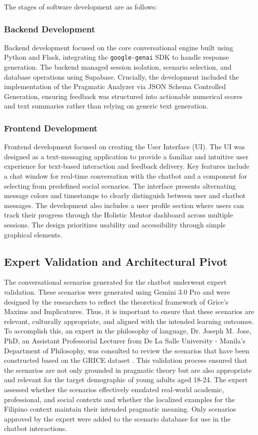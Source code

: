 The stages of software development are as follows:

\subsubsection{Backend Development}
\indent Backend development focused on the core conversational engine built using Python and Flask, integrating the \texttt{google-genai} SDK to handle response generation. 
The backend managed session isolation, scenario selection, and database operations using Supabase. Crucially, the development included the implementation of the 
Pragmatic Analyzer via JSON Schema Controlled Generation, ensuring feedback was structured into actionable numerical scores and text summaries rather than relying on 
generic text generation.

\subsubsection{Frontend Development}
\indent Frontend development focused on creating the User Interface (UI). The UI was designed as a 
text-messaging application to provide a familiar and intuitive user experience for text-based interaction and feedback delivery. Key features include a 
chat window for real-time conversation with the chatbot and a component for selecting from predefined social scenarios. The interface presents 
alternating message colors and timestamps to clearly distinguish between user and chatbot messages. The development also includes 
a user profile section where users can track their progress through the Holistic Mentor dashboard across multiple sessions. 
The design prioritizes usability and accessibility through simple graphical elements.

\subsection{Expert Validation and Architectural Pivot}
\indent The conversational scenarios generated for the chatbot underwent expert validation. 
These scenarios were generated using Gemini 3.0 Pro and were designed by the researchers to reflect the theoretical 
framework of Grice's Maxims and Implicatures. Thus, it is important to ensure that these scenarios are relevant, culturally appropriate, and aligned with the intended learning 
outcomes. To accomplish this, an expert in the philosophy of language, Dr. Joseph M. Jose, PhD, an Assistant Professorial Lecturer from 
De La Salle University - Manila's Department of Philosophy, was consulted to review the scenarios that have been constructed based on the 
GRICE dataset \cite{zheng_grice_2021}. This validation process ensured that the scenarios are not only grounded in pragmatic theory but are also appropriate and relevant 
for the target demographic of young adults aged 18-24. The expert assessed whether the scenarios effectively emulated 
real-world academic, professional, and social contexts and whether the localized examples for the Filipino context maintain their intended pragmatic meaning. 
Only scenarios approved by the expert were added to the scenario database for use in the chatbot interactions.

